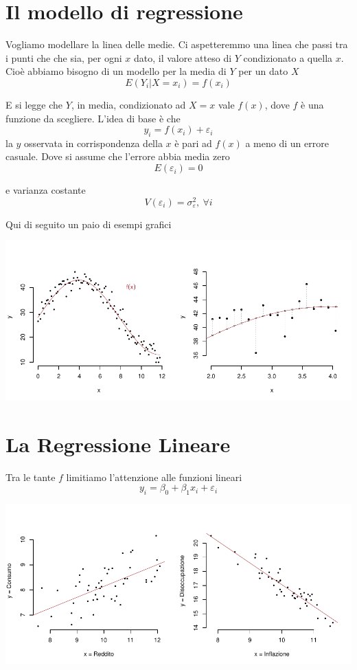 \documentclass[
  11pt,
]{book}
\theoremstyle{mytheoremstyle}
\theoremstyle{mydefstyle}
\begin{document}
\section{Il modello di regressione}\label{il-modello-di-regressione}

Vogliamo modellare la linea delle medie. Ci aspetteremmo una linea che passi tra i punti che
che sia, per ogni \(x\) dato, il valore atteso di \(Y\) condizionato a quella \(x\).
Cioè abbiamo bisogno di un modello per la media di \(Y\) per un dato \(X\)
\[E(Y_i|X=x_i)=f(x_i)\]

E si legge che \(Y\), in media, condizionato ad \(X=x\) vale \(f(x)\), dove \(f\) è una funzione da scegliere.
L'idea di base è che
\[y_i=f(x_i)+\varepsilon_i\]
la \(y\) osservata in corrispondenza della \(x\) è pari ad \(f(x)\) a meno di un errore casuale.
Dove si assume che l'errore abbia media zero
\[E(\varepsilon_i)=0\]

e varianza costante
\[V(\varepsilon_i)=\sigma^2_{\varepsilon}, ~\forall i\]

Qui di seguito un paio di esempi grafici

\begin{center}\includegraphics{Appunti_di_Statistica_2025_files/figure-latex/17-regressione-I-3,-1} \end{center}

\section{La Regressione Lineare}\label{la-regressione-lineare}

Tra le tante \(f\) limitiamo l'attenzione alle funzioni lineari
\[y_i=\beta_0+\beta_1x_i+\varepsilon_i\]

\begin{center}\includegraphics{Appunti_di_Statistica_2025_files/figure-latex/17-regressione-I-5,-1} \end{center}
\end{document}
